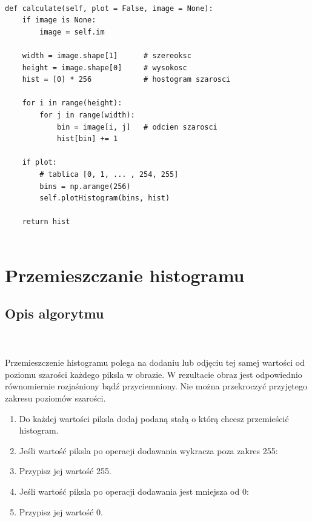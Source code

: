 \documentclass[final,a4paper,openany,12pt]{mwbk}
\begin{document}

\begin{lstlisting}[caption=Obliczanie histogramu]
	
def calculate(self, plot = False, image = None):
	if image is None:
		image = self.im
	
	width = image.shape[1]      # szereoksc
	height = image.shape[0]     # wysokosc
	hist = [0] * 256            # hostogram szarosci
	
	for i in range(height):
		for j in range(width):
			bin = image[i, j]   # odcien szarosci
			hist[bin] += 1
	
	if plot:
		# tablica [0, 1, ... , 254, 255]
		bins = np.arange(256)
		self.plotHistogram(bins, hist)
	
	return hist
	
\end{lstlisting}

\newpage





\section{Przemieszczanie histogramu}
\subsection*{Opis algorytmu}
\hfill
\\\\
\indent Przemieszczenie histogramu polega na dodaniu lub odjęciu tej samej wartości od poziomu szarości każdego piksla w obrazie.
W rezultacie obraz jest odpowiednio równomiernie rozjaśniony bądź przyciemniony.
Nie można przekroczyć przyjętego zakresu poziomów szarości.
\begin{enumerate}
	\item Do każdej wartości piksla dodaj podaną stałą o którą chcesz przemieścić histogram.
	\item Jeśli wartość piksla po operacji dodawania wykracza poza zakres 255:
	\item Przypisz jej wartość 255.
	\item Jeśli wartość piksla po operacji dodawania jest mniejsza od 0:
	\item Przypisz jej wartość 0.
\end{enumerate}
\end{document}
